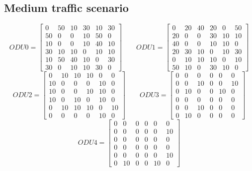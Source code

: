 \subsection{Medium traffic scenario}

\[
ODU0=
\begin{bmatrix}
	0 & 50 & 10 & 30 & 10 & 30 \\
	50 & 0 & 0 & 10 & 50 & 0 \\
	10 & 0 & 0 & 10 & 40 & 10 \\
	30 & 10 & 10 & 0 & 10 & 10 \\
	10 & 50 & 40 & 10 & 0 & 30 \\
	30 & 0 & 10 & 10 & 30 & 0
\end{bmatrix}
\qquad ODU1=
\begin{bmatrix}
	0 & 20 & 40 & 20 & 0 & 50 \\
	20 & 0 & 0 & 30 & 10 & 10 \\
	40 & 0 & 0 & 10 & 10 & 0 \\
	20 & 30 & 10 & 0 & 10 & 30 \\
	0 & 10 & 10 & 10 & 0 & 10 \\
	50 & 10 & 0 & 30 & 10 & 0
\end{bmatrix}
\]
\[
ODU2=
\begin{bmatrix}
0 & 10 & 10 & 10 & 0 & 0 \\
10 & 0 & 0 & 0 & 10 & 0 \\
10 & 0 & 0 & 10 & 10 & 0 \\
10 & 0 & 10 & 0 & 10 & 0 \\
0 & 10 & 10 & 10 & 0 & 10 \\
0 & 0 & 0 & 0 & 10 & 0
\end{bmatrix}
\qquad ODU3=
\begin{bmatrix}
0 & 0 & 0 & 0 & 0 & 0 \\
0 & 0 & 10 & 0 & 0 & 10 \\
0 & 10 & 0 & 0 & 10 & 0 \\
0 & 0 & 0 & 0 & 0 & 0 \\
0 & 0 & 10 & 0 & 0 & 0 \\
0 & 10 & 0 & 0 & 0 & 0
\end{bmatrix}
\]
\[
ODU4=
\begin{bmatrix}
0 & 0 & 0 & 0 & 0 & 0 \\
0 & 0 & 0 & 0 & 0 & 10 \\
0 & 0 & 0 & 0 & 0 & 0 \\
0 & 0 & 0 & 0 & 0 & 0 \\
0 & 0 & 0 & 0 & 0 & 10 \\
0 & 10 & 0 & 0 & 10 & 0
\end{bmatrix}
\]

